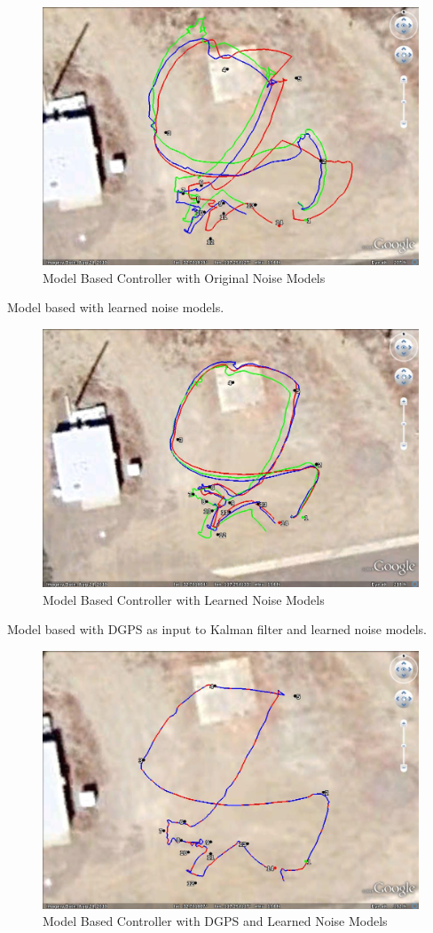 \begin{figure}[ht!]
	\centering
	\includegraphics[width=.75\textwidth]{images/GE/20101203_1551_kf_lyapOrigQR}
	\caption{Model Based Controller with Original Noise Models}
	\label{fig:kfResults1}
\end{figure}

Model based with learned noise models.

\begin{figure}[ht!]
	\centering
	\includegraphics[width=.75\textwidth]{images/GE/20101203_1545_kf_lyapNewQR}
	\caption{Model Based Controller with Learned Noise Models}
	\label{fig:kfResults2}
\end{figure}

Model based with DGPS as input to Kalman filter and learned noise models.

\begin{figure}[ht!]
	\centering
	\includegraphics[width=.75\textwidth]{images/GE/20101203_1606_kf_lyapUsingDgpsNewQR}
	\caption{Model Based Controller with DGPS and Learned Noise Models}
	\label{fig:kfResults3}
\end{figure}

